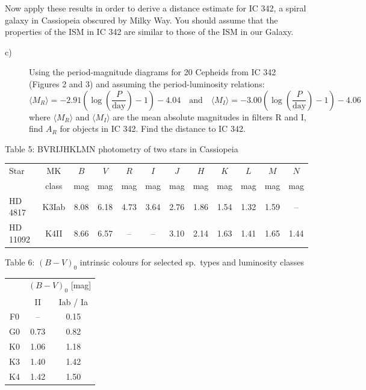 Now apply these results in order to derive a distance estimate for IC 342, a
spiral galaxy in Cassiopeia obscured by Milky Way. You should assume that the
properties of the ISM in IC 342 are similar to those of the ISM in our Galaxy.

\begin{description}
\item[c)] Using the period-magnitude diagrams for 20 Cepheids from IC 342
  (Figures 2 and 3) and assuming the period-luminosity relations:
  \[ \langle M_R \rangle = -2.91 \left( \log\left(\frac{P}{\mathrm{day}}\right)
     - 1 \right) - 4.04 \quad \text{and} \quad
     \langle M_I \rangle = -3.00 \left( \log\left(\frac{P}{\mathrm{day}}\right)
     - 1 \right) - 4.06 \]
  where $\langle M_R \rangle$ and $\langle M_I \rangle$ are the mean absolute
  magnitudes in filters R and I, find $A_R$ for objects in IC 342. Find the
  distance to IC 342.
\end{description}

\medskip
\noindent Table 5: BVRIJHKLMN photometry of two stars in Cassiopeia

\begin{center}
\begin{tabular}{lccccccccccc}
\hline
Star & MK & $B$ & $V$ & $R$ & $I$ & $J$ & $H$ & $K$ & $L$ & $M$ & $N$ \\
 & class & mag & mag & mag & mag & mag & mag & mag & mag & mag & mag \\
\hline
HD 4817 & K3Iab & 8.08 & 6.18 & 4.73 & 3.64 & 2.76 & 1.86 & 1.54 & 1.32 &
  1.59 & -- \\
HD 11092 & K4II & 8.66 & 6.57 & -- & -- & 3.10 & 2.14 & 1.63 & 1.41 & 1.65 &
  1.44 \\
\hline
\end{tabular}
\end{center}

\medskip
\noindent Table 6: $(B-V)_0$ intrinsic colours for selected sp.\ types and
luminosity classes

\begin{center}
\begin{tabular}{ccc}
\hline
 & \multicolumn{2}{c}{$(B-V)_0$ [mag]} \\
 & II & Iab / Ia \\
\hline
F0 & -- & 0.15 \\
G0 & 0.73 & 0.82 \\
K0 & 1.06 & 1.18 \\
K3 & 1.40 & 1.42 \\
K4 & 1.42 & 1.50 \\
\hline
\end{tabular}
\end{center}

